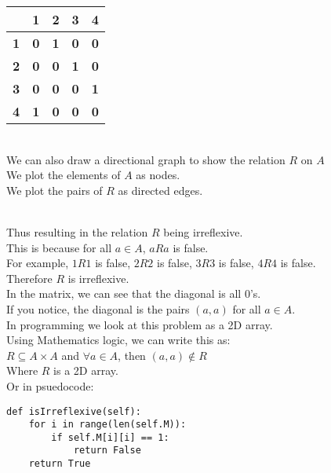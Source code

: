 \begin{tabular}{|c|c|c|c|c|}
\hline
\multicolumn{1}{|c|}{\textbf{}} & \multicolumn{1}{c|}{\textbf{1}} & \multicolumn{1}{c|}{\textbf{2}} & \multicolumn{1}{c|}{\textbf{3}} & \multicolumn{1}{c|}{\textbf{4}} \\ \hline
\multicolumn{1}{|c|}{\textbf{1}} & \multicolumn{1}{c|}{\textbf{0}} & \multicolumn{1}{c|}{\textbf{1}} & \multicolumn{1}{c|}{\textbf{0}} & \multicolumn{1}{c|}{\textbf{0}} \\ \hline
\multicolumn{1}{|c|}{\textbf{2}} & \multicolumn{1}{c|}{\textbf{0}} & \multicolumn{1}{c|}{\textbf{0}} & \multicolumn{1}{c|}{\textbf{1}} & \multicolumn{1}{c|}{\textbf{0}} \\ \hline
\multicolumn{1}{|c|}{\textbf{3}} & \multicolumn{1}{c|}{\textbf{0}} & \multicolumn{1}{c|}{\textbf{0}} & \multicolumn{1}{c|}{\textbf{0}} & \multicolumn{1}{c|}{\textbf{1}} \\ \hline
\multicolumn{1}{|c|}{\textbf{4}} & \multicolumn{1}{c|}{\textbf{1}} & \multicolumn{1}{c|}{\textbf{0}} & \multicolumn{1}{c|}{\textbf{0}} & \multicolumn{1}{c|}{\textbf{0}} \\ \hline
\end{tabular} \\
We can also draw a directional graph to show the relation $R$ on $A$ \\
We plot the elements of $A$ as nodes. \\
We plot the pairs of $R$ as directed edges. \\
 \\
Thus resulting in the relation $R$ being irreflexive. \\
This is because for all $a \in A$, $aRa$ is false. \\
For example, $1R1$ is false, $2R2$ is false, $3R3$ is false, $4R4$ is false. \\
Therefore $R$ is irreflexive. \\
In the matrix, we can see that the diagonal is all 0's. \\
If you notice, the diagonal is the pairs $(a,a)$ for all $a \in A$. \\
In programming we look at this problem as a 2D array. \\
Using Mathematics logic, we can write this as: \\
$R \subseteq A \times A$ and $\forall a \in A$, then $(a,a) \notin R$ \\
Where $R$ is a 2D array. \\
Or in psuedocode: \\
\begin{lstlisting}
def isIrreflexive(self):
    for i in range(len(self.M)):
        if self.M[i][i] == 1:
            return False
    return True
\end{lstlisting}

